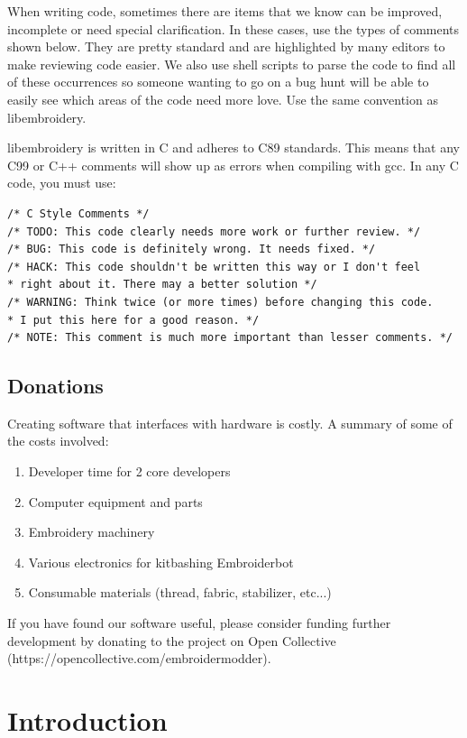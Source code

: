 \documentclass[11pt]{report}
\begin{document}
When writing code, sometimes there are items that we know can be improved,
incomplete or need special clarification. In these cases, use the types of
comments shown below. They are pretty standard and are highlighted by many editors to
make reviewing code easier. We also use shell scripts to parse the code to find
all of these occurrences so someone wanting to go on a bug hunt will be able to
easily see which areas of the code need more love. Use the same convention
as libembroidery.

libembroidery is written in C and adheres to C89 standards. This means
that any C99 or C++ comments will show up as errors when compiling with
gcc. In any C code, you must use:

\begin{lstlisting}
/* C Style Comments */
/* TODO: This code clearly needs more work or further review. */
/* BUG: This code is definitely wrong. It needs fixed. */
/* HACK: This code shouldn't be written this way or I don't feel
* right about it. There may a better solution */
/* WARNING: Think twice (or more times) before changing this code.
* I put this here for a good reason. */
/* NOTE: This comment is much more important than lesser comments. */
\end{lstlisting}

\subsection{Donations}

Creating software that interfaces with hardware is costly. A summary
of some of the costs involved:

\begin{enumerate}
\item Developer time for 2 core developers
\item Computer equipment and parts
\item Embroidery machinery
\item Various electronics for kitbashing Embroiderbot
\item Consumable materials (thread, fabric, stabilizer, etc...)
\end{enumerate}

If you have found our software useful, please consider funding further
development by donating to the project on Open Collective
(https://opencollective.com/embroidermodder).

\section{Introduction}
\end{document}
